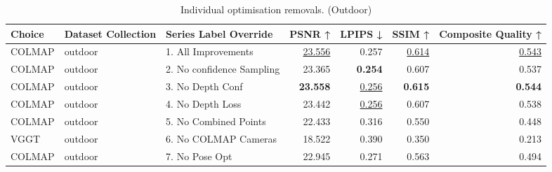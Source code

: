 \begin{table}[H]
\caption{\ifdefined\customcaption \customcaption \else Individual optimisation removals. (Outdoor) \fi}
\label{tab:99_all_improvements_removals_outdoor}
\centering
\scriptsize
\begin{tabular}{lllrrrr}
\toprule
Choice & Dataset Collection & Series Label Override & PSNR ↑ & LPIPS ↓ & SSIM ↑ & Composite Quality ↑ \\
\midrule
COLMAP & outdoor & 1. All Improvements & \underline{23.556} & 0.257 & \underline{0.614} & \underline{0.543} \\
COLMAP & outdoor & 2. No confidence Sampling & 23.365 & \textbf{0.254} & 0.607 & 0.537 \\
COLMAP & outdoor & 3. No Depth Conf & \textbf{23.558} & \underline{0.256} & \textbf{0.615} & \textbf{0.544} \\
COLMAP & outdoor & 4. No Depth Loss & 23.442 & \underline{0.256} & 0.607 & 0.538 \\
COLMAP & outdoor & 5. No Combined Points & 22.433 & 0.316 & 0.550 & 0.448 \\
VGGT & outdoor & 6. No COLMAP Cameras & 18.522 & 0.390 & 0.350 & 0.213 \\
COLMAP & outdoor & 7. No Pose Opt & 22.945 & 0.271 & 0.563 & 0.494 \\
\bottomrule
\end{tabular}
\end{table}